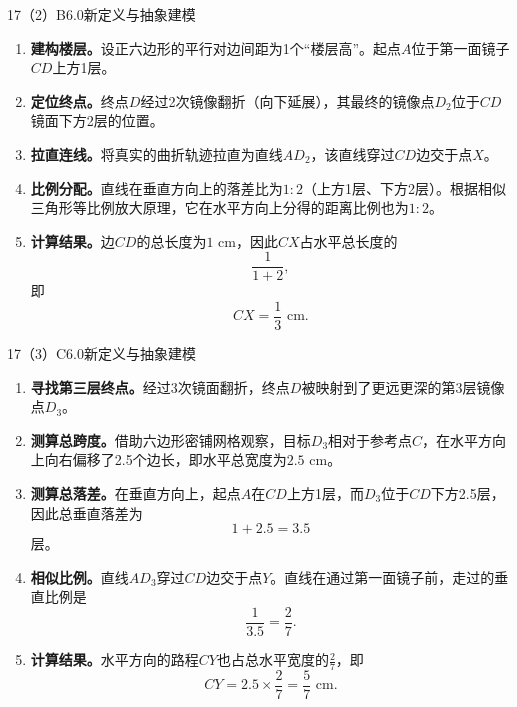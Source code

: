 \begin{solution}{17（2）}{B}{6.0}{新定义与抽象建模}

\begin{enumerate}[label=\textbf{Step \arabic*:},leftmargin=*]
  \item \textbf{建构楼层。}设正六边形的平行对边间距为1个“楼层高”。起点\(A\)位于第一面镜子\(CD\)上方1层。
  \item \textbf{定位终点。}终点\(D\)经过2次镜像翻折（向下延展），其最终的镜像点\(D_2\)位于\(CD\)镜面下方2层的位置。
  \item \textbf{拉直连线。}将真实的曲折轨迹拉直为直线\(AD_2\)，该直线穿过\(CD\)边交于点\(X\)。
  \item \textbf{比例分配。}直线在垂直方向上的落差比为\(1:2\)（上方1层、下方2层）。根据相似三角形等比例放大原理，它在水平方向上分得的距离比例也为\(1:2\)。
  \item \textbf{计算结果。}边\(CD\)的总长度为\(1\text{ cm}\)，因此\(CX\)占水平总长度的
  \[
    \frac1{1+2},
  \]
  即
  \[
    CX=\frac13\text{ cm}.
  \]
\end{enumerate}

\end{solution}

\begin{solution}{17（3）}{C}{6.0}{新定义与抽象建模}

\begin{enumerate}[label=\textbf{Step \arabic*:},leftmargin=*]
  \item \textbf{寻找第三层终点。}经过3次镜面翻折，终点\(D\)被映射到了更远更深的第3层镜像点\(D_3\)。
  \item \textbf{测算总跨度。}借助六边形密铺网格观察，目标\(D_3\)相对于参考点\(C\)，在水平方向上向右偏移了2.5个边长，即水平总宽度为\(2.5\text{ cm}\)。
  \item \textbf{测算总落差。}在垂直方向上，起点\(A\)在\(CD\)上方1层，而\(D_3\)位于\(CD\)下方2.5层，因此总垂直落差为
  \[
    1+2.5=3.5
  \]
  层。
  \item \textbf{相似比例。}直线\(AD_3\)穿过\(CD\)边交于点\(Y\)。直线在通过第一面镜子前，走过的垂直比例是
  \[
    \frac1{3.5}=\frac27.
  \]
  \item \textbf{计算结果。}水平方向的路程\(CY\)也占总水平宽度的\(\frac27\)，即
  \[
    CY=2.5\times\frac27=\frac57\text{ cm}.
  \]
\end{enumerate}

\end{solution}


